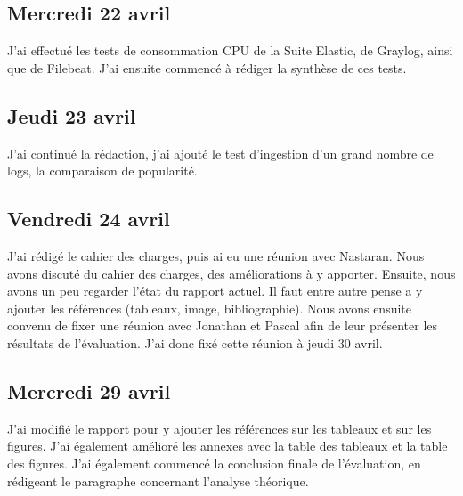 \documentclass[paper=a4, fontsize=11pt]{scrartcl}
\begin{document}
\subsection{Mercredi 22 avril}
    J'ai effectué les tests de consommation CPU de la Suite Elastic, de Graylog, ainsi que de Filebeat. J'ai ensuite commencé à rédiger la synthèse de ces tests.
\subsection{Jeudi 23 avril}
    J'ai continué la rédaction, j'ai ajouté le test d'ingestion d'un grand nombre de logs, la comparaison de popularité.
\subsection{Vendredi 24 avril}
    J'ai rédigé le cahier des charges, puis ai eu une réunion avec Nastaran. Nous avons discuté du cahier des charges, des améliorations à y apporter. Ensuite, nous avons un peu regarder l'état du rapport actuel. Il faut entre autre pense a y ajouter les références (tableaux, image, bibliographie). Nous avons ensuite convenu de fixer une réunion avec Jonathan et Pascal afin de leur présenter les résultats de l'évaluation. J'ai donc fixé cette réunion à jeudi 30 avril.
\subsection{Mercredi 29 avril}
    J'ai modifié le rapport pour y ajouter les références sur les tableaux et sur les figures. J'ai également amélioré les annexes avec la table des tableaux et la table des figures. J'ai également commencé la conclusion finale de l'évaluation, en rédigeant le paragraphe concernant l'analyse théorique.
    
\end{document}

